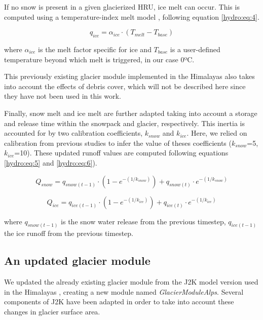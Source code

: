 If no snow is present in a given glacierized HRU, ice melt can occur. This is computed using a temperature-index melt model \citep{hock_temperature_2003}, following equation \ref{hydro:eq:4}.

\begin{equation} \label{hydro:eq:4}
q_{ice} = \alpha_{ice } \cdot(T_{melt} - T_{base})
\end{equation} 

where $\alpha_{ice}$ is the melt factor specific for ice and $T_{base}$ is a user-defined temperature beyond which melt is triggered, in our case 0ºC. 

This previously existing glacier module implemented in the Himalayas also takes into account the effects of debris cover, which will not be described here since they have not been used in this work. 

Finally, snow melt and ice melt are further adapted taking into account a storage and release time within the snowpack and glacier, respectively. This inertia is accounted for by two calibration coefficients, $k_{snow}$ and $k_{ice}$. Here, we relied on calibration from previous studies to infer the value of theses coefficients ($k_{snow}$=5, $k_{ice}$=10). These updated runoff values are computed following equations \ref{hydro:eq:5} and \ref{hydro:eq:6}).

\begin{equation} \label{hydro:eq:5}
Q_{snow} = q_{snow(t-1)}\cdot (1-e^{-(1/k_{snow})}) + q_{snow(t)} \cdot e^{-(1/k_{snow})}
\end{equation} 

\begin{equation} \label{hydro:eq:6}
Q_{ice} = q_{ice(t-1)} \cdot (1-e^{-(1/k_{ice})}) + q_{ice(t)} \cdot e^{-(1/k_{ice})}
\end{equation} 

where $q_{snow(t-1)}$ is the snow water release from the previous timestep, $q_{ice(t-1)}$ the ice runoff from the previous timestep.

\subsection{An updated glacier module}

We updated the already existing glacier module from the J2K model version used in the Himalayas \citep{nepal_understanding_2014}, creating a new module named \textit{GlacierModuleAlps}. Several components of J2K have been adapted in order to take into account these changes in glacier surface area. 

